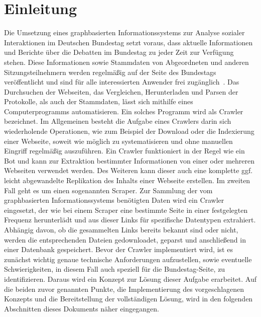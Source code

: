 \section{Einleitung}\label{sec:02_01_einleitung}
Die Umsetzung eines graphbasierten Informationssystems zur Analyse sozialer
Interaktionen im Deutschen Bundestag setzt voraus, dass aktuelle Informationen und Berichte über die Debatten im Bundestag zu jeder Zeit zur Verfügung stehen. Diese Informationen sowie Stammdaten von Abgeordneten und anderen Sitzungsteilnehmern werden regelmäßig auf der Seite des Bundestags veröffentlicht und sind für alle interessierten Anwender frei zugänglich~\cite{OpenData2019}. Das Durchsuchen der Webseiten, das Vergleichen, Herunterladen und Parsen der Protokolle, als auch der Stammdaten, lässt sich mithilfe eines Computerprogramms automatisieren. Ein solches Programm wird als Crawler bezeichnet. Im Allgemeinen besteht die Aufgabe eines Crawlers darin sich wiederholende Operationen, wie zum Beispiel der Download oder die Indexierung einer Webseite, soweit wie möglich zu systematisieren und ohne manuellen Eingriff regelmäßig auszuführen. Ein Crawler funktioniert in der Regel wie ein Bot und kann zur Extraktion bestimmter Informationen von einer oder mehreren Webseiten verwendet werden. Des Weiteren kann dieser auch eine komplette ggf. leicht abgewandelte Replikation des Inhalts einer Webseite erstellen. Im zweiten Fall geht es um einen sogenannten Scraper. Zur Sammlung der vom graphbasierten Informationssystems benötigten Daten wird ein Crawler eingesetzt, der wie bei einem Scraper eine bestimmte Seite in einer festgelegten Frequenz herunterlädt und aus dieser Links für spezifische Datentypen extrahiert. Abhängig davon, ob die gesammelten Links bereits bekannt sind oder nicht, werden die entsprechenden Dateien gedownloadet, geparst und anschließend in einer Datenbank gespeichert. Bevor der Crawler implementiert wird, ist es zunächst wichtig genaue technische Anforderungen aufzustellen, sowie eventuelle Schwierigkeiten, in diesem Fall auch speziell für die Bundestag-Seite, zu identifizieren. Daraus wird ein Konzept zur Lösung dieser Aufgabe erarbeitet. Auf die beiden zuvor genannten Punkte, die Implementierung des vorgeschlagenen Konzepts und die Bereitstellung der vollständigen Lösung, wird in den folgenden Abschnitten dieses Dokuments näher eingegangen.